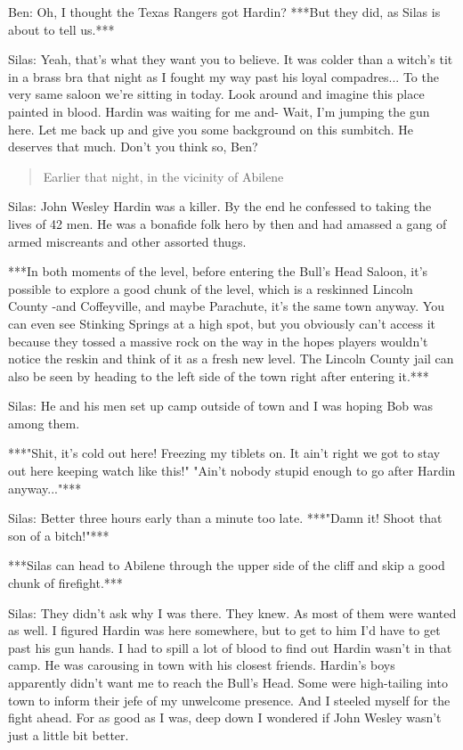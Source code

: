 \documentclass{article}
\begin{document}
Ben: Oh, I thought the Texas Rangers got Hardin? ***But they did, as Silas is about to tell us.***

Silas: Yeah, that's what they want you to believe. It was colder than a witch's tit in a brass bra that night as I fought my way past his loyal compadres... To the very same saloon we're sitting in today. Look around and imagine this place painted in blood. Hardin was waiting for me and- Wait, I'm jumping the gun here. Let me back up and give you some background on this sumbitch. He deserves that much. Don't you think so, Ben?

\begin{quote}
    Earlier that night, in the vicinity of Abilene
\end{quote}

Silas: John Wesley Hardin was a killer. By the end he confessed to taking the lives of 42 men. He was a bonafide folk hero by then and had amassed a gang of armed miscreants and other assorted thugs.

***In both moments of the level, before entering the Bull's Head Saloon, it's possible to explore a good chunk of the level, which is a reskinned Lincoln County -and Coffeyville, and maybe Parachute, it's the same town anyway. You can even see Stinking Springs at a high spot, but you obviously can't access it because they tossed a massive rock on the way in the hopes players wouldn't notice the reskin and think of it as a fresh new level. The Lincoln County jail can also be seen by heading to the left side of the town right after entering it.***

Silas: He and his men set up camp outside of town and I was hoping Bob was among them.

***"Shit, it's cold out here! Freezing my tiblets on. It ain't right we got to stay out here keeping watch like this!" "Ain't nobody stupid enough to go after Hardin anyway..."***

Silas: Better three hours early than a minute too late. ***"Damn it! Shoot that son of a bitch!"***

***Silas can head to Abilene through the upper side of the cliff and skip a good chunk of firefight.***

Silas: They didn't ask why I was there. They knew. As most of them were wanted as well. I figured Hardin was here somewhere, but to get to him I'd have to get past his gun hands. I had to spill a lot of blood to find out Hardin wasn't in that camp. He was carousing in town with his closest friends. Hardin's boys apparently didn't want me to reach the Bull's Head. Some were high-tailing into town to inform their jefe of my unwelcome presence. And I steeled myself for the fight ahead. For as good as I was, deep down I wondered if John Wesley wasn't just a little bit better.
\end{document}
